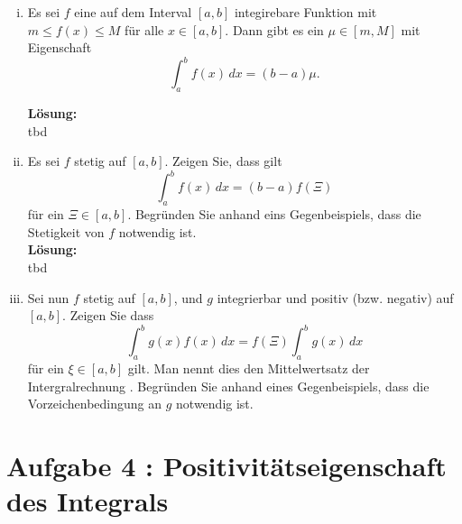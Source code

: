 \documentclass[11pt,a4paper,ngerman]{article}
\begin{document}
\begin{enumerate}[i)]
    \item Es sei $f$ eine auf dem Interval $[a,b]$ integirebare Funktion mit $m \leq f(x) \leq M$ für alle $x\in[a,b]$. Dann gibt es ein $\mu \in [m,M]$ mit Eigenschaft
$$
    \int_{a}^{b} f(x) \, dx = (b - a) \mu.
$$

\textbf{Lösung:}\\

tbd

    \item Es sei $f$ stetig auf $[a,b]$. Zeigen Sie, dass gilt 
$$
    \int_{a}^{b} f(x)\, dx = (b-a) f(\Xi)
$$
für ein $\Xi\in [a,b]$. Begründen Sie anhand eins Gegenbeispiels, dass die Stetigkeit von $f$ notwendig ist.\\

\textbf{Lösung:}\\

tbd

    \item Sei nun $f$ stetig auf $[a,b]$, und $g$ integrierbar und positiv (bzw. negativ) auf $[a,b]$. Zeigen Sie dass 
$$
    \int_{a}^{b} g(x)f(x)\, dx = f(\Xi) \int_{a}^{b} g(x) \, dx
$$ 
für ein $\xi \in [a,b]$ gilt. Man nennt dies den Mittelwertsatz der Intergralrechnung   . Begründen Sie anhand eines Gegenbeispiels, dass die Vorzeichenbedingung an $g$ notwendig ist. 
\end{enumerate}


\section*{Aufgabe 4 : \mdseries Positivitätseigenschaft des Integrals}
\end{document}
